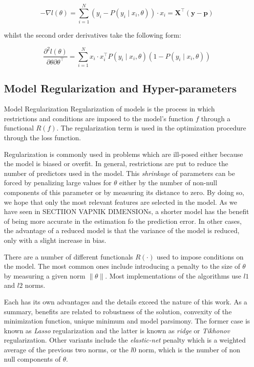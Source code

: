 \[
- \nabla  l(\theta) = \sum_{i=1}^N (y_i - P(y_i \mid x_i,\theta))\cdot x_i = \textbf{X}^{\intercal}(\textbf{y}-\textbf{p})
\]

whilst the second order derivatives take the following form:

\[
\frac{\partial^2 l(\theta)}{\partial \theta \partial \theta^\intercal} = \sum_{i=1}^N x_i \cdot x_i^\intercal P(y_i \mid x_i,\theta)(1 -P(y_i \mid x_i,\theta))
\]



\subsection{Model Regularization and Hyper-parameters}


\begin{definition}{Model Regularization}
	Regularization of models is the process in which restrictions and conditions are imposed  to the model's function $f$ through a functional $ R(f)$. The regularization term is used in the optimization procedure through the loss function.
\end{definition}

Regularization is commonly used in problems which are ill-posed either because the model is biased or overfit. In general, restrictions are put to reduce the number of predictors used in the model. This \textit{shrinkage} of parameters can be forced by penalizing large values for $\theta$ either by the number of non-null components of this parameter or by measuring its distance to zero. By doing so, we hope that only the most relevant features are selected in the model. As we have seen in SECTIION VAPNIK DIMENSIONs, a shorter model has the benefit of being more accurate in the estimation fo the prediction error. In other cases, the advantage of a reduced model is that the variance of the model is reduced, only with a slight increase in bias. 


There are a number of different functionals $R(\cdot)$ used to impose conditions on the model. The most common ones include introducing a penalty to the size of $\theta$ by measuring a given norm  $\| \theta \|$.  Most implementations of the algorithms use $l1$ and $l2$ norms.

 Each has its own advantages and the details exceed the nature of this work. As a summary, benefits are related to robustness of the solution, convexity of the minimization function, unique minimum and model parsimony. The former case is known as \textit{ Lasso} regularization and the latter is known as \textit{ridge} or \textit{Tikhonov} regularization. Other variants include the \textit{elastic-net} penalty which is a weighted average of the previous two norms, or the $l0$ norm, which is the number of non null components of $\theta$. 



